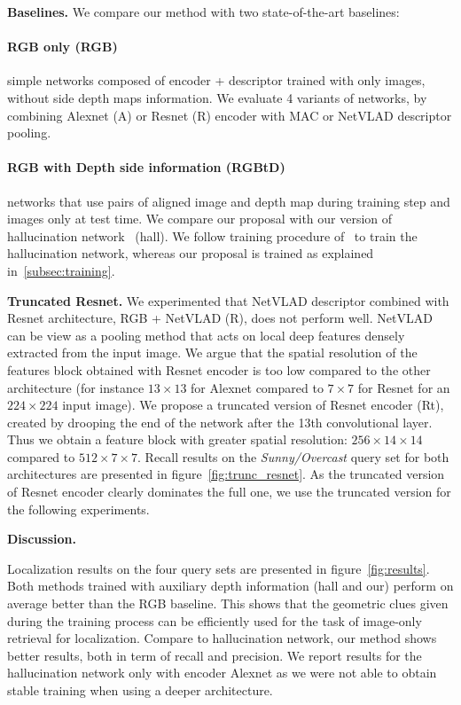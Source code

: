 \noindent\textbf{Baselines.} We compare our method with two state-of-the-art baselines:
    \paragraph{RGB only (\textbf{RGB})} simple networks composed of encoder + descriptor trained with only images, without side depth maps information. We evaluate 4 variants of networks, by combining Alexnet (A) or Resnet (R) encoder with MAC or NetVLAD descriptor pooling.
    \paragraph{RGB with Depth side information (\textbf{RGBtD})} networks that use pairs of aligned image and depth map during training step and images only at test time. We compare our proposal with our version of hallucination network~\cite{Hoffman2016} (hall). We follow training procedure of~\cite{Hoffman2016} to train the hallucination network, whereas our proposal is trained as explained in~\ref{subsec:training}. 

\vspace{4pt}\noindent\textbf{Truncated Resnet.} We experimented that NetVLAD descriptor combined with Resnet architecture, RGB + NetVLAD (R), does not perform well. NetVLAD can be view as a pooling method that acts on local deep features densely extracted from the input image. We argue that the spatial resolution of the features block obtained with Resnet encoder is too low compared to the other architecture (for instance $13\times13$ for Alexnet compared to $7\times7$ for Resnet for an $224\times224$ input image). We propose a truncated version of Resnet encoder (Rt), created by drooping the end of the network after the 13th convolutional layer. Thus we obtain a feature block with greater spatial resolution: $256\times14\times14$ compared to $512\times7\times7$. Recall results on the \textit{Sunny/Overcast} query set for both architectures are presented in figure~\ref{fig:trunc_resnet}. As the truncated version of Resnet encoder clearly dominates the full one, we use the truncated version for the following experiments.

\vspace{4pt}\noindent\textbf{Discussion.} 

Localization results on the four query sets are presented in figure~\ref{fig:results}. Both methods trained with auxiliary depth information (hall and our) perform on average better than the RGB baseline. This shows that the geometric clues given during the training process can be efficiently used for the task of image-only retrieval for localization. Compare to hallucination network, our method shows better results, both in term of recall and precision. We report results for the hallucination network only with encoder Alexnet as we were not able to obtain stable training when using a deeper architecture. 

